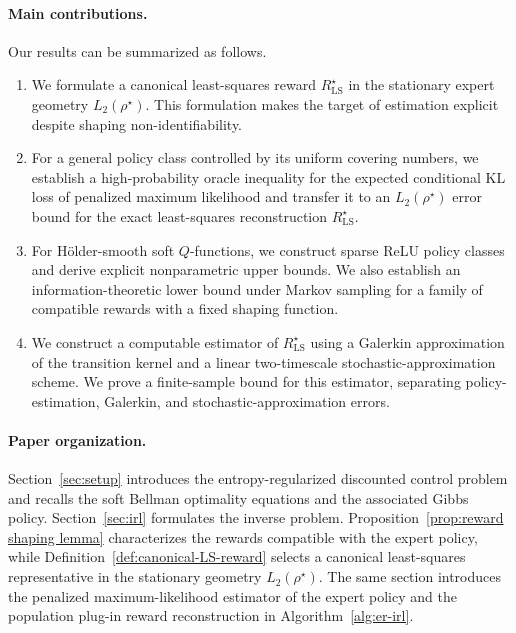 \documentclass{article}
\theoremstyle{definition}
\theoremstyle{remark}
\theoremstyle{plain}
\numberwithin{equation}{section}
\begin{document}
\paragraph{Main contributions.}
Our results can be summarized as follows.
\begin{enumerate}[label=\textup{(\roman*)}]
    \item We formulate a canonical least-squares reward
    \(R_{\operatorname{LS}}^{\star}\) in the stationary expert geometry
    \(L_2(\rho^\star)\). This formulation makes the target of estimation
    explicit despite shaping non-identifiability.

    \item For a general policy class controlled by its uniform covering
    numbers, we establish a high-probability oracle inequality for the
    expected conditional KL loss of penalized maximum likelihood and
    transfer it to an \(L_2(\rho^\star)\) error bound for the exact
    least-squares reconstruction \(R_{\operatorname{LS}}^{\star}\).

    \item For H\"older-smooth soft \(Q\)-functions, we construct sparse
ReLU policy classes and derive explicit nonparametric upper bounds.
We also establish an information-theoretic lower bound under Markov
sampling for a family of compatible rewards with a fixed shaping
function.

    \item We construct a computable estimator of
    \(R_{\operatorname{LS}}^\star\) using a Galerkin approximation of the
    transition kernel and a linear two-timescale stochastic-approximation
    scheme. We prove a finite-sample bound for this estimator, separating
    policy-estimation, Galerkin, and
    stochastic-approximation errors.
\end{enumerate}

\paragraph{Paper organization.}
Section~\ref{sec:setup} introduces the entropy-regularized discounted
control problem and recalls the soft Bellman optimality equations and
the associated Gibbs policy.
Section~\ref{sec:irl} formulates the inverse problem.
Proposition~\ref{prop:reward shaping lemma} characterizes the rewards
compatible with the expert policy, while
Definition~\ref{def:canonical-LS-reward} selects a canonical
least-squares representative in the stationary geometry
\(L_2(\rho^\star)\).
The same section introduces the penalized maximum-likelihood estimator
of the expert policy and the population plug-in reward reconstruction
in Algorithm~\ref{alg:er-irl}.
\end{document}
